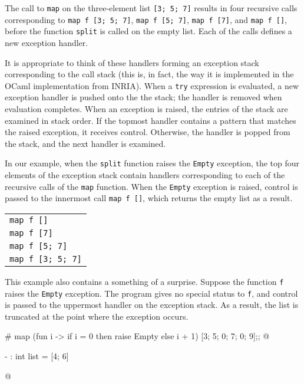 The call to \hbox{\lstinline/map/} on the three-element list \hbox{\lstinline/[3; 5; 7]/} results in four
recursive calls corresponding to \hbox{\lstinline/map f [3; 5; 7]/},
\hbox{\lstinline/map f [5; 7]/},
\hbox{\lstinline/map f [7]/}, and
\hbox{\lstinline/map f []/}, before the function \hbox{\lstinline/split/} is
called on the empty list.  Each of the calls defines a new exception handler.

It is appropriate to think of these handlers forming an exception stack corresponding to the call
stack (this is, in fact, the way it is implemented in the OCaml implementation from INRIA).  When a
\hbox{\lstinline/try/} expression is evaluated, a new exception handler is pushed
onto the the stack; the handler is removed when evaluation completes.  When an exception is raised,
the entries of the stack are examined in stack order.  If the topmost handler contains a pattern
that matches the raised exception, it receives control.  Otherwise, the handler is popped from the
stack, and the next handler is examined.

In our example, when the \hbox{\lstinline/split/} function raises the \hbox{\lstinline/Empty/} exception, the top
four elements of the exception stack contain handlers corresponding to each of the recursive calls
of the \hbox{\lstinline/map/} function.  When the \hbox{\lstinline/Empty/} exception is raised,
control is passed to the innermost call \hbox{\lstinline/map f []/}, which returns
the empty list as a result.

\begin{center}
\begin{tabular}{|l|}
\hline
{\hbox{\lstinline/map f []/}}\\
{\hbox{\lstinline/map f [7]/}}\\
{\hbox{\lstinline/map f [5; 7]/}}\\
{\hbox{\lstinline/map f [3; 5; 7]/}}\\
\hline
\end{tabular}
\end{center}
%
This example also contains a something of a surprise.  Suppose the function \hbox{\lstinline/f/} raises
the \hbox{\lstinline/Empty/} exception.  The program gives no special status to \hbox{\lstinline/f/}, and control
is passed to the uppermost handler on the exception stack.  As a result, the list is truncated at
the point where the exception occurs.

\begin{ocaml}
# map (fun i ->
          if i = 0 then
             raise Empty
          else
             i + 1) [3; 5; 0; 7; 0; 9];;
@
\begin{topoutput}
- : int list = [4; 6]
\end{topoutput}
@
\end{ocaml}

